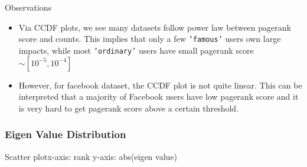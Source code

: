 Observations
\begin{itemize}
\item Via CCDF plots, we see many datasets follow power law between pagerank score and counts. This implies that only a few \texttt{'famous'} users own large impacts, while most \texttt{'ordinary'} users have small pagerank score $\sim [10^{-5}, 10^{-4}]$
\item However, for facebook dataset, the CCDF plot is not quite linear. This can be interpreted that a majority of Facebook users have low pagerank score and it is very hard to get pagerank score above a certain threshold.
\end{itemize}

\subsubsection{Eigen Value Distribution}

Scatter plot\quad x-axis: rank \quad y-axis: abs(eigen value)

